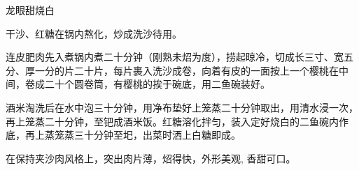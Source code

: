\begin{recipe}{龙眼甜烧白}

\ingredients


\cooking

\step 干沙、红糖在锅内熬化，炒成洗沙待用。

\step 连皮肥肉先入煮锅内煮二十分钟（刚熟未炤为度），捞起晾冷，切成长三寸、宽五分、厚一分的片二十片，每片裹入洗沙成卷，向着有皮的一面按上一个樱桃在中间，卷成二十个圆卷筒，有樱桃的挨于碗底，用二鱼碗装好。

\step 酒米淘洗后在水中泡三十分钟，用净布垫好上笼蒸二十分钟取出，用清水浸一次，再上笼蒸二十分钟，至钯成酒米饭。红糖溶化拌匀，装入定好烧白的二鱼碗内作底，再上蒸笼蒸三十分钟至圯，出菜时洒上白糖即成。

\notes

在保持夹沙肉风格上，突出肉片薄，炤得快，外形美观, 香甜可口。

\end{recipe}

